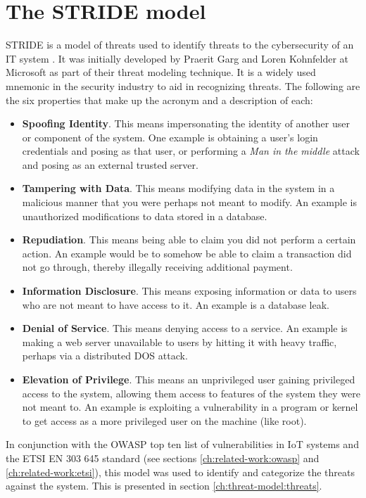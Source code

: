\section{The STRIDE model} \label{ch:method:stride}
STRIDE is a model of threats used to identify threats to the cybersecurity of an IT system \cite{stride}. It was initially developed by Praerit Garg and Loren Kohnfelder at Microsoft as part of their threat modeling technique. It is a widely used mnemonic in the security industry to aid in recognizing threats. The following are the six properties that make up the acronym and a description of each:
\begin{itemize}
    \item \textbf{Spoofing Identity}. This means impersonating the identity of another user or component of the system. One example is obtaining a user's login credentials and posing as that user, or performing a \textit{Man in the middle} attack and posing as an external trusted server.
    \item \textbf{Tampering with Data}. This means modifying data in the system in a malicious manner that you were perhaps not meant to modify. An example is unauthorized modifications to data stored in a database.
    \item \textbf{Repudiation}. This means being able to claim you did not perform a certain action. An example would be to somehow be able to claim a transaction did not go through, thereby illegally receiving additional payment.
    \item \textbf{Information Disclosure}. This means exposing information or data to users who are not meant to have access to it. An example is a database leak.
    \item \textbf{Denial of Service}. This means denying access to a service. An example is making a web server unavailable to users by hitting it with heavy traffic, perhaps via a distributed \gls{DOS} attack.
    \item \textbf{Elevation of Privilege}. This means an unprivileged user gaining privileged access to the system, allowing them access to features of the system they were not meant to. An example is exploiting a vulnerability in a program or kernel to get access as a more privileged user on the machine (like root).
\end{itemize}
In conjunction with the OWASP top ten list of vulnerabilities in IoT systems and the ETSI EN 303 645 standard (see sections \ref{ch:related-work:owasp} and \ref{ch:related-work:etsi}), this model was used to identify and categorize the threats against the system. This is presented in section \ref{ch:threat-model:threats}.

